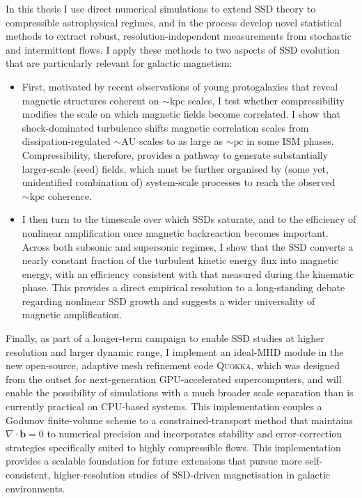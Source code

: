 \documentclass[12pt,twoside]{extreport}
\newcommand{\mVector}[1]{\bm{#1}} %
\begin{document}
In this thesis I use direct numerical simulations to extend SSD theory to compressible astrophysical regimes, and in the process develop novel statistical methods to extract robust, resolution-independent measurements from stochastic and intermittent flows. I apply these methods to two aspects of SSD evolution that are particularly relevant for galactic magnetism:
\begin{itemize}
    \item First, motivated by recent observations of young protogalaxies that reveal magnetic structures coherent on $\sim \mathrm{kpc}$ scales, I test whether compressibility modifies the scale on which magnetic fields become correlated. I show that shock-dominated turbulence shifts magnetic correlation scales from dissipation-regulated $\sim \mathrm{AU}$ scales to as large as $\sim \mathrm{pc}$ in some ISM phases. Compressibility, therefore, provides a pathway to generate substantially larger-scale (seed) fields, which must be further organised by (some yet, unidentified combination of) system-scale processes to reach the observed $\sim \mathrm{kpc}$ coherence.

    \item I then turn to the timescale over which SSDs saturate, and to the efficiency of nonlinear amplification once magnetic backreaction becomes important. Across both subsonic and supersonic regimes, I show that the SSD converts a nearly constant fraction of the turbulent kinetic energy flux into magnetic energy, with an efficiency consistent with that measured during the kinematic phase. This provides a direct empirical resolution to a long-standing debate regarding nonlinear SSD growth and suggests a wider universality of magnetic amplification.
\end{itemize}

Finally, as part of a longer-term campaign to enable SSD studies at higher resolution and larger dynamic range, I implement an ideal-MHD module in the new open-source, adaptive mesh refinement code \textsc{Quokka}, which was designed from the outset for next-generation GPU-accelerated supercomputers, and will enable the possibility of simulations with a much broader scale separation than is currently practical on CPU-based systems. This implementation couples a Godunov finite-volume scheme to a constrained-transport method that maintains $\nabla\cdot\mVector{b} = 0$ to numerical precision and incorporates stability and error-correction strategies specifically suited to highly compressible flows. This implementation provides a scalable foundation for future extensions that pursue more self-consistent, higher-resolution studies of SSD-driven magnetisation in galactic environments.
\end{document}
